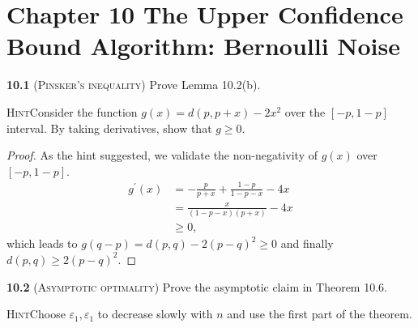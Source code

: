 \chapter*{Chapter 10 The Upper Confidence Bound Algorithm: Bernoulli Noise}
\label{sec:tenth}

\noindent\textbf{10.1} (\textsc{Pinsker’s inequality}) Prove Lemma 10.2(b).

\noindent\textsc{Hint}\quad Consider the function $g(x)=d(p, p+x)-2 x^{2}$ over the $[-p, 1-p]$ interval.
By taking derivatives, show that $g \geq 0$.

\begin{proof}
    As the hint suggested, we validate the non-negativity of $g(x)$ over $[-p, 1-p]$.
    \begin{equation*}
        \begin{aligned}
            g^\prime(x)
            &= -\frac{p}{p+x} + \frac{1-p}{1-p-x} - 4x\\
            &= \frac{x}{(1-p-x)(p+x)} - 4x\\
            &\geq 0,
        \end{aligned}
    \end{equation*}
    which leads to $g(q-p) = d(p, q) - 2(p-q)^2 \geq 0$ and finally $d(p, q) \geq 2(p-q)^2$.
\end{proof}

\noindent\textbf{10.2} (\textsc{Asymptotic optimality}) Prove the asymptotic claim in Theorem 10.6.

\noindent\textsc{Hint}\quad Choose $\varepsilon_{1}, \varepsilon_{1}$ to decrease slowly with $n$ and use the first part of the theorem.

